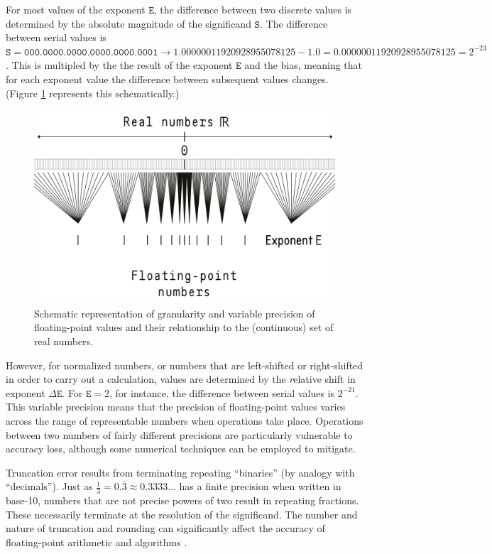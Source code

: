 \documentclass[twoside]{article}
\begin{document}
For most values of the exponent $\texttt{E}$, the difference between two discrete values is determined by the absolute magnitude of the significand $\texttt{S}$.  The difference between serial values is $\texttt{S} = \texttt{000.0000.0000.0000.0000.0001} \rightarrow 1.00000011920928955078125 - 1.0 = 0.00000011920928955078125 = 2^{-23}$.  This is multipled by the the result of the exponent $\texttt{E}$ and the bias, meaning that for each exponent value the difference between subsequent values changes.  (Figure \ref{fig:fp-res} represents this schematically.)

\begin{figure}[htb]
\includegraphics[width=\textwidth]{img/fp-res}
\caption{Schematic representation of granularity and variable precision of floating-point values and their relationship to the (continuous) set of real numbers.}
\label{fig:fp-res}
\end{figure}

However, for normalized numbers, or numbers that are left-shifted or right-shifted in order to carry out a calculation, values are determined by the {\emph relative shift} in exponent $\Delta\texttt{E}$.  For $\texttt{E} = 2$, for instance, the difference between serial values is $2^{-21}$.  This variable precision means that the precision of floating-point values varies across the range of representable numbers when operations take place.  Operations between two numbers of fairly different precisions are particularly vulnerable to accuracy loss, although some numerical techniques can be employed to mitigate.

Truncation error results from terminating repeating “binaries” (by analogy with “decimals”).  Just as $\frac{1}{3} = 0.\bar{3} \approx 0.3333…$ has a finite precision when written in base-10, numbers that are not precise powers of two result in repeating fractions.  These necessarily terminate at the resolution of the significand.  The number and nature of truncation and rounding can significantly affect the accuracy of floating-point arithmetic and algorithms \citep{Izquierdo2006}.
 
\end{document}
